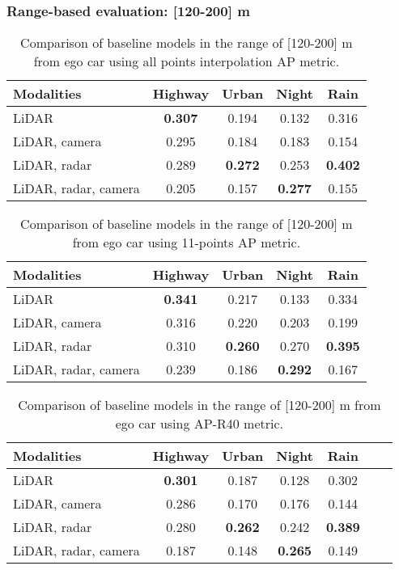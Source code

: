\documentclass{article}
\begin{document}
\newpage
\subsubsection{Range-based evaluation: [120-200] m}
\begin{table*}[!h]
  \small
  \centering
  \begin{tabular}{@{}l|cccc@{}}
    \toprule
    Modalities          & Highway   & Urban     & Night     & Rain  \\
    \midrule
    LiDAR               & \bf{0.307}& 0.194     & 0.132     & 0.316 \\
    LiDAR, camera       & 0.295     & 0.184     & 0.183     & 0.154 \\
    LiDAR, radar        & 0.289     & \bf{0.272}& 0.253     & \bf{0.402} \\
    LiDAR, radar, camera & 0.205    & 0.157     & \bf{0.277}& 0.155 \\
    \bottomrule
  \end{tabular}
  \caption{Comparison of baseline models in the range of [120-200] m from ego car using all points interpolation AP metric.}
  \label{tab:metrics11}
\end{table*}

\begin{table*}[!h]
  \small
  \centering
  \begin{tabular}{@{}l|cccc@{}}
    \toprule
    Modalities          & Highway   & Urban     & Night     & Rain \\
    \midrule
    LiDAR               & \bf{0.341}& 0.217     & 0.133     & 0.334 \\
    LiDAR, camera       & 0.316     & 0.220     & 0.203     & 0.199 \\
    LiDAR, radar        & 0.310     & \bf{0.260}& 0.270     & \bf{0.395} \\
    LiDAR, radar, camera & 0.239    & 0.186     & \bf{0.292}& 0.167 \\
    \bottomrule
  \end{tabular}
  \caption{Comparison of baseline models in the range of [120-200] m from ego car using 11-points AP metric.}
  \label{tab:metrics12}
\end{table*}

\begin{table*}[!h]
  \small
  \centering
  \begin{tabular}{@{}l|cccccc@{}}
    \toprule
    Modalities          & Highway   & Urban     & Night     & Rain \\
    \midrule
    LiDAR               & \bf{0.301}& 0.187     & 0.128     & 0.302 \\
    LiDAR, camera       & 0.286     & 0.170     & 0.176     & 0.144 \\
    LiDAR, radar        & 0.280     & \bf{0.262}& 0.242     & \bf{0.389} \\
    LiDAR, radar, camera & 0.187    & 0.148     & \bf{0.265}& 0.149 \\
    \bottomrule
  \end{tabular}
  \caption{Comparison of baseline models in the range of [120-200] m from ego car using AP-R40 metric.}
  \label{tab:metrics13}
\end{table*}
\end{document}
